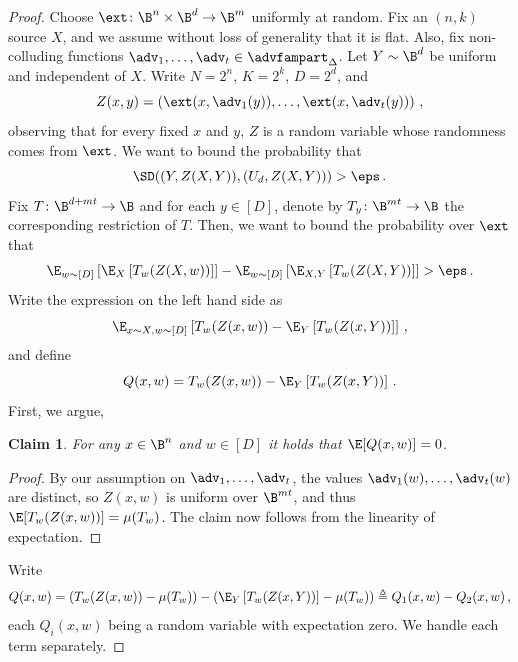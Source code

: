\documentclass[11pt]{article}
\numberwithin{equation}{section}
\newtheorem{claim}[theorem]{Claim}
\theoremstyle{definition}
\theoremstyle{plain}
\begin{document}
\begin{proof}
Choose $\ext \colon \B^{n} \times \B^{d} \rightarrow \B^{m}$ uniformly at random.
Fix an $(n,k)$ source $X$, and we assume without loss of generality that it is flat. Also, fix non-colluding functions $\adv_1,\ldots,\adv_t \in \advfampart_{\Delta}$. Let $Y \sim \B^{d}$ be uniform and independent of $X$.
Write $N = 2^n$, $K = 2^k$, $D = 2^d$, and
\[
Z(x,y) = \left( \ext(x,\adv_1(y)),\ldots,\ext(x,\adv_t(y)) \right)\,,
\]
observing that for every fixed $x$ and $y$, $Z$ is a random variable whose
randomness comes from $\ext$. We want to bound the probability that
\[
\SD( (Y,Z(X,Y)),(U_d,Z(X,Y)) ) > \eps\,.
\]
Fix $T \colon \B^{d+mt}\rightarrow\B$ and for each $y \in [D]$, denote by
$T_y \colon \B^{mt} \rightarrow \B$ the corresponding restriction of $T$.
Then, we want to bound the probability over $\ext$ that
\[
\E_{w \sim [D]}\left[ \E_{X}\left[ T_{w}(Z(X,w)) \right] \right] - \E_{w \sim [D]}\left[ \E_{X,Y}\left[ T_{w}(Z(X,Y)) \right] \right] > \eps\,.
\]
Write the expression on the left hand side as
\[
\E_{x \sim X,w \sim [D]}\left[ T_{w}(Z(x,w)) - \E_{Y}\left[ T_{w}(Z(x,Y)) \right] \right]\,,
\]
and define
\[
Q(x,w) = T_{w}(Z(x,w)) - \E_{Y}\left[ T_{w}(Z(x,Y)) \right] \,.
\]
First, we argue,
\begin{claim}
For any $x \in \B^n$ and $w \in [D]$ it holds that $\E[Q(x,w)] = 0$.
\end{claim}
\begin{proof}
By our assumption on $\adv_1,\ldots,\adv_t$, the values $\adv_{1}(w),\ldots,\adv_{t}(w)$ 
are distinct, so $Z(x,w)$ is uniform over $\B^{mt}$, and thus $\E[T_{w}(Z(x,w))] = \mu(T_w)$.
The claim now follows from the linearity of expectation.
\end{proof}

Write
\[
Q(x,w) =\left( T_{w}(Z(x,w)) - \mu(T_w) \right) - \left( \E_{Y}\left[ T_{w}(Z(x,Y)) \right] - \mu(T_w) \right) 
\triangleq Q_{1}(x,w) - Q_{2}(x,w)\,,
\]
each $Q_{i}(x,w)$ being a random variable with expectation zero. We handle each term
separately.

%

\end{proof}
\end{document}
